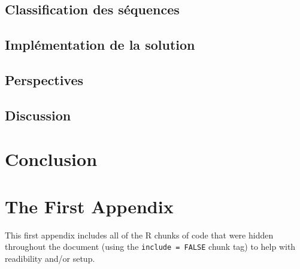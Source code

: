 \documentclass[12pt,twoside]{reedthesis}
\begin{document}
\hypertarget{classification-des-suxe9quences}{%
\section{Classification des séquences}\label{classification-des-suxe9quences}}

\hypertarget{impluxe9mentation-de-la-solution}{%
\section{Implémentation de la solution}\label{impluxe9mentation-de-la-solution}}

\hypertarget{perspectives-2}{%
\section{Perspectives}\label{perspectives-2}}

\hypertarget{discussion-2}{%
\section{Discussion}\label{discussion-2}}

\hypertarget{conclusion-1}{%
\chapter*{Conclusion}\label{conclusion-1}}

\appendix

\hypertarget{the-first-appendix}{%
\chapter{The First Appendix}\label{the-first-appendix}}

This first appendix includes all of the R chunks of code that were hidden throughout the document (using the \texttt{include\ =\ FALSE} chunk tag) to help with readibility and/or setup.
\end{document}
